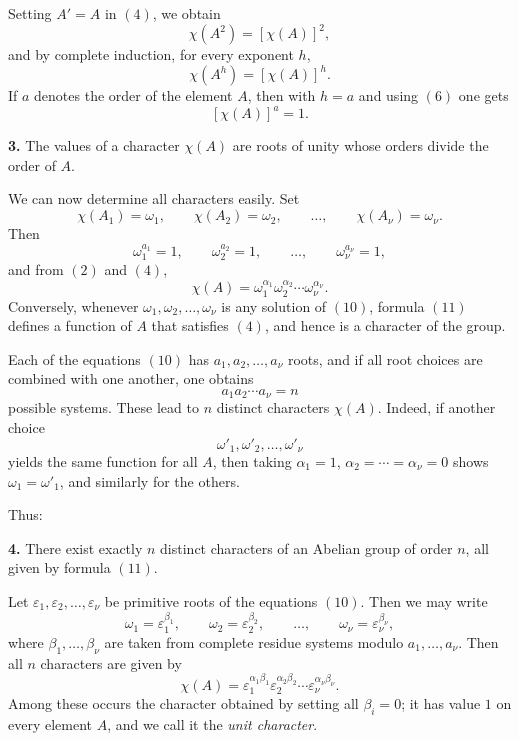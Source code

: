 \documentclass[11pt]{article}
\begin{document}
\medskip
Setting \(A'=A\) in \((4)\), we obtain
\[
\chi(A^2)=[\chi(A)]^2,
\]
and by complete induction, for every exponent \(h\),
\[
\chi(A^h)=[\chi(A)]^h.
\tag{7}
\]
If \(a\) denotes the order of the element \(A\), then with \(h=a\) and using \((6)\) one gets
\[
[\chi(A)]^a=1.
\tag{8}
\]

\medskip
\noindent\textbf{3.} The values of a character \(\chi(A)\) are roots of unity whose orders divide the order of \(A\).

\medskip
We can now determine all characters easily. Set
\[
\chi(A_1)=\omega_1,\qquad \chi(A_2)=\omega_2,\qquad \dots,\qquad \chi(A_\nu)=\omega_\nu.
\tag{9}
\]
Then
\[
\omega_1^{a_1}=1,\qquad \omega_2^{a_2}=1,\qquad \dots,\qquad \omega_\nu^{a_\nu}=1,
\tag{10}
\]
and from \((2)\) and \((4)\),
\[
\chi(A)=\omega_1^{\alpha_1}\omega_2^{\alpha_2}\cdots \omega_\nu^{\alpha_\nu}.
\tag{11}
\]
Conversely, whenever \(\omega_1,\omega_2,\dots,\omega_\nu\) is any solution of \((10)\), formula \((11)\) defines a function of \(A\) that satisfies \((4)\), and hence is a character of the group.

Each of the equations \((10)\) has \(a_1,a_2,\dots,a_\nu\) roots, and if all root choices are combined with one another, one obtains
\[
a_1a_2\cdots a_\nu=n
\]
possible systems. These lead to \(n\) distinct characters \(\chi(A)\). Indeed, if another choice
\[
\omega'_1,\omega'_2,\dots,\omega'_\nu
\]
yields the same function for all \(A\), then taking \(\alpha_1=1\), \(\alpha_2=\cdots=\alpha_\nu=0\) shows \(\omega_1=\omega'_1\), and similarly for the others.

Thus:

\medskip
\noindent\textbf{4.} There exist exactly \(n\) distinct characters of an Abelian group of order \(n\), all given by formula \((11)\).

\medskip
Let \(\varepsilon_1,\varepsilon_2,\dots,\varepsilon_\nu\) be primitive roots of the equations \((10)\). Then we may write
\[
\omega_1=\varepsilon_1^{\beta_1},\qquad \omega_2=\varepsilon_2^{\beta_2},\qquad \dots,\qquad \omega_\nu=\varepsilon_\nu^{\beta_\nu},
\tag{12}
\]
where \(\beta_1,\dots,\beta_\nu\) are taken from complete residue systems modulo \(a_1,\dots,a_\nu\). Then all \(n\) characters are given by
\[
\chi(A)=\varepsilon_1^{\alpha_1\beta_1}\varepsilon_2^{\alpha_2\beta_2}\cdots\varepsilon_\nu^{\alpha_\nu\beta_\nu}.
\tag{13}
\]
Among these occurs the character obtained by setting all \(\beta_i=0\); it has value \(1\) on every element \(A\), and we call it the \emph{unit character}.
\end{document}
